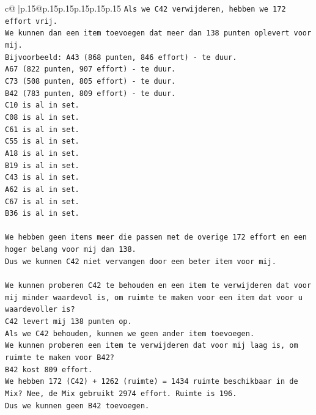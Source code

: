\documentclass{article}
\begin{document}
{\begin{supertabular}{c@{$\;$}|p{.15\linewidth}@{}p{.15\linewidth}p{.15\linewidth}p{.15\linewidth}p{.15\linewidth}p{.15\linewidth}}
{{{\texttt{Als we C42 verwijderen, hebben we 172 effort vrij.} \\
\texttt{We kunnen dan een item toevoegen dat meer dan 138 punten oplevert voor mij.} \\
\texttt{Bijvoorbeeld: A43 (868 punten, 846 effort) {-} te duur.} \\
\texttt{A67 (822 punten, 907 effort) {-} te duur.} \\
\texttt{C73 (508 punten, 805 effort) {-} te duur.} \\
\texttt{B42 (783 punten, 809 effort) {-} te duur.} \\
\texttt{C10 is al in set.} \\
\texttt{C08 is al in set.} \\
\texttt{C61 is al in set.} \\
\texttt{C55 is al in set.} \\
\texttt{A18 is al in set.} \\
\texttt{B19 is al in set.} \\
\texttt{C43 is al in set.} \\
\texttt{A62 is al in set.} \\
\texttt{C67 is al in set.} \\
\texttt{B36 is al in set.} \\
\\ 
\texttt{We hebben geen items meer die passen met de overige 172 effort en een hoger belang voor mij dan 138.} \\
\texttt{Dus we kunnen C42 niet vervangen door een beter item voor mij.} \\
\\ 
\texttt{We kunnen proberen C42 te behouden en een item te verwijderen dat voor mij minder waardevol is, om ruimte te maken voor een item dat voor u waardevoller is?} \\
\texttt{C42 levert mij 138 punten op.} \\
\texttt{Als we C42 behouden, kunnen we geen ander item toevoegen.} \\
\texttt{We kunnen proberen een item te verwijderen dat voor mij laag is, om ruimte te maken voor B42?} \\
\texttt{B42 kost 809 effort.} \\
\texttt{We hebben 172 (C42) + 1262 (ruimte) = 1434 ruimte beschikbaar in de Mix? Nee, de Mix gebruikt 2974 effort. Ruimte is 196.} \\
\texttt{Dus we kunnen geen B42 toevoegen.} \\
\\ 
}}}
\end{supertabular}}
\end{document}
